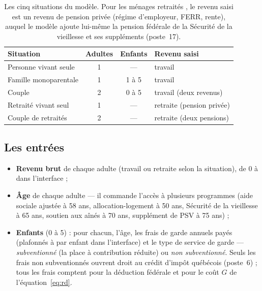 \begin{table}[ht]
\centering
\small
\begin{tabular}{l c c l}
\toprule
Situation & Adultes & Enfants & Revenu saisi \\
\midrule
Personne vivant seule        & 1 & ---        & travail \\
Famille monoparentale        & 1 & 1 à 5      & travail \\
Couple                       & 2 & 0 à 5      & travail (deux revenus) \\
Retraité vivant seul         & 1 & ---        & retraite (pension privée) \\
Couple de retraités          & 2 & ---        & retraite (deux pensions) \\
\bottomrule
\end{tabular}
\caption{Les cinq situations du modèle. Pour les ménages \og retraités \fg{},
le revenu saisi est un revenu de pension privée (régime d'employeur, FERR,
rente), auquel le modèle ajoute lui-même la pension fédérale de la Sécurité
de la vieillesse et ses suppléments (poste~17).}
\label{tab:situations}
\end{table}

\subsection{Les entrées}

\begin{itemize}
  \item \textbf{Revenu brut} de chaque adulte (travail ou retraite selon la
        situation), de 0 à  dans l'interface ;
  \item \textbf{Âge} de chaque adulte --- il commande l'accès à plusieurs
        programmes (aide sociale ajustée à 58 ans, allocation-logement à
        50 ans, Sécurité de la vieillesse à 65 ans, soutien aux aînés à
        70 ans, supplément de PSV à 75 ans) ;
  \item \textbf{Enfants} (0 à 5) : pour chacun, l'âge, les frais de garde
        annuels payés (plafonnés à  par enfant dans l'interface) et
        le type de service de garde --- \emph{subventionné} (la place à
        contribution réduite) ou \emph{non subventionné}. Seuls les frais non
        subventionnés ouvrent droit au crédit d'impôt québécois (poste~6) ;
        tous les frais comptent pour la déduction fédérale et pour le coût
        $G$ de l'équation~\eqref{eq:rd}.
\end{itemize}

